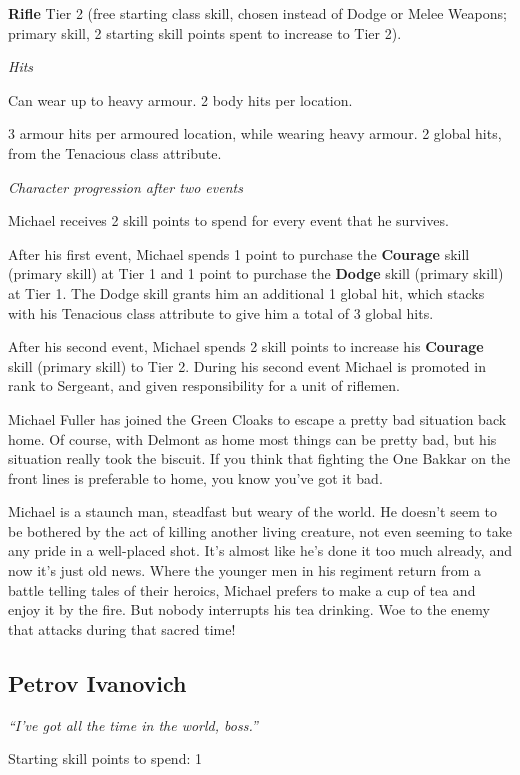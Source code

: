 \textbf{Rifle} Tier 2 (free starting class skill, chosen instead of Dodge or Melee Weapons; primary skill, 2 starting skill points spent to increase to Tier 2).

\textit{Hits}

Can wear up to heavy armour. 2 body hits per location.

3 armour hits per armoured location, while wearing heavy armour. 2 global hits, from the Tenacious class attribute.

\textit{Character progression after two events}

Michael receives 2 skill points to spend for every event that he survives.

After his first event, Michael spends 1 point to purchase the \textbf{Courage} skill (primary skill) at Tier 1 and 1 point to purchase the \textbf{Dodge} skill (primary skill) at Tier 1. The Dodge skill grants him an additional 1 global hit, which stacks with his Tenacious class attribute to give him a total of 3 global hits.

After his second event, Michael spends 2 skill points to increase his \textbf{Courage} skill (primary skill) to Tier 2. During his second event Michael is promoted in rank to Sergeant, and given responsibility for a unit of riflemen.

Michael Fuller has joined the Green Cloaks to escape a pretty bad situation back home. Of course, with Delmont as home most things can be pretty bad, but his situation really took the biscuit. If you think that fighting the One Bakkar on the front lines is preferable to home, you know you've got it bad.

Michael is a staunch man, steadfast but weary of the world. He doesn't seem to be bothered by the act of killing another living creature, not even seeming to take any pride in a well-placed shot. It's almost like he's done it too much already, and now it's just old news. Where the younger men in his regiment return from a battle telling tales of their heroics, Michael prefers to make a cup of tea and enjoy it by the fire. But nobody interrupts his tea drinking. Woe to the enemy that attacks during that sacred time!

\subsection{Petrov Ivanovich}

\textit{``I've got all the time in the world, boss.''}

Starting skill points to spend: 1

